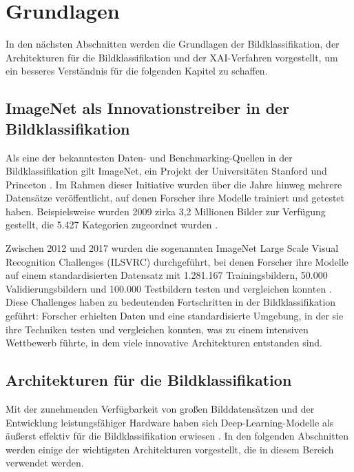 \chapter{Grundlagen}
\label{chap:chapter-2}

In den nächsten Abschnitten werden die Grundlagen der Bildklassifikation, der Architekturen für die Bildklassifikation und der XAI-Verfahren vorgestellt, um ein besseres Verständnis für die folgenden Kapitel zu schaffen.

\section{ImageNet als Innovationstreiber in der Bildklassifikation}

Als eine der bekanntesten Daten- und Benchmarking-Quellen in der Bildklassifikation gilt ImageNet, ein Projekt der Universitäten Stanford und Princeton \cite{imagenet_homepage}. Im Rahmen dieser Initiative wurden über die Jahre hinweg mehrere Datensätze veröffentlicht, auf denen Forscher ihre Modelle trainiert und getestet haben. Beispielsweise wurden 2009 zirka 3,2 Millionen Bilder zur Verfügung gestellt, die 5.427 Kategorien zugeordnet wurden \cite{deng2009imagenet}.

Zwischen 2012 und 2017 wurden die sogenannten ImageNet Large Scale Visual Recognition Challenges (ILSVRC) durchgeführt, bei denen Forscher ihre Modelle auf einem standardisierten Datensatz mit 1.281.167 Trainingsbildern, 50.000 Validierungsbildern und 100.000 Testbildern \cite{imagenet_download} testen und vergleichen konnten \cite{imagenet_lsvrc_challenge, imagenet_homepage}. Diese Challenges haben zu bedeutenden Fortschritten in der Bildklassifikation geführt: Forscher erhielten Daten und eine standardisierte Umgebung, in der sie ihre Techniken testen und vergleichen konnten, was zu einem intensiven Wettbewerb führte, in dem viele innovative Architekturen entstanden sind.

\section{Architekturen für die Bildklassifikation}

Mit der zunehmenden Verfügbarkeit von großen Bilddatensätzen und der Entwicklung leistungsfähiger Hardware haben sich Deep-Learning-Modelle als äußerst effektiv für die Bildklassifikation erwiesen \cite{alex2012alexnet}. In den folgenden Abschnitten werden einige der wichtigsten Architekturen vorgestellt, die in diesem Bereich verwendet werden.

